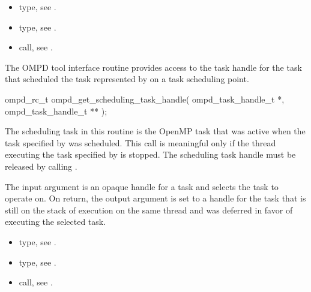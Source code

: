 \crossreferences
\begin{itemize}
	\item {} type, see .
	\item {} type, see .
	\item {} call, see 
	.
\end{itemize}


\label{subsubsubsec:ompd_get_scheduling_task_handle}
\summary
The OMPD tool interface routine  provides access to 
the task handle for the task that scheduled the task represented by  on 
a task scheduling point.

\format

\begin{cspecific}
\begin{ompSyntax}
ompd_rc_t ompd_get_scheduling_task_handle(
  ompd_task_handle_t *,
  ompd_task_handle_t **
);
\end{ompSyntax}
\end{cspecific}


\descr
The scheduling task in this routine is the OpenMP task that was active when
the task specified by  was scheduled. 
This call is meaningful only if the thread executing the task specified
by   is stopped. 
The scheduling task handle must be released by calling .

\argdesc
The input argument  is an opaque handle for a task and selects the task to operate on.
On return, the output argument  is set to a handle for the 
task that is
still on the stack of execution on the same thread and was deferred in favor of executing the selected task.

\crossreferences
\begin{itemize}
	\item {} type, see .
	\item {} type, see .
	\item {} call, see 
	.
\end{itemize}


